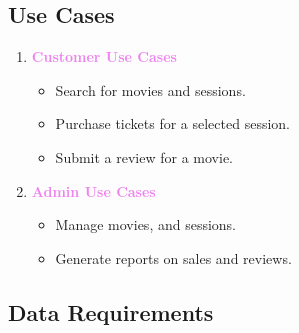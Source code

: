 \documentclass[a4paper,12pt]{article}  %
\renewcommand{\textbf}[1]{\textcolor{violet}{\bfseries #1}}
\begin{document}
\subsection{Use Cases}

\begin{enumerate}
    \item \textbf{Customer Use Cases}
    \begin{itemize}
        \item Search for movies and sessions.
        \item Purchase tickets for a selected session.
        \item Submit a review for a movie.
    \end{itemize}
    
    \item \textbf{Admin Use Cases}
    \begin{itemize}
        \item Manage movies, and sessions.
        \item Generate reports on sales and reviews.
    \end{itemize}
\end{enumerate}

\subsection{Data Requirements}
\end{document}
